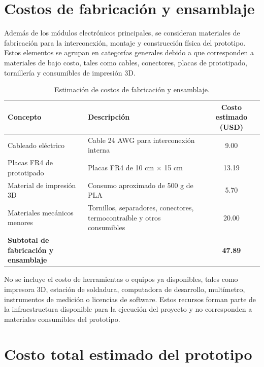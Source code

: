 \section{Costos de fabricación y ensamblaje}

Además de los módulos electrónicos principales, se consideran materiales de
fabricación para la interconexión, montaje y construcción física del prototipo.
Estos elementos se agrupan en categorías generales debido a que corresponden a
materiales de bajo costo, tales como cables, conectores, placas de prototipado,
tornillería y consumibles de impresión 3D.

\begin{table}[H]
\centering
\caption{Estimación de costos de fabricación y ensamblaje.}
\label{tab:presupuesto_fabricacion}
\begin{tabularx}{\textwidth}{X X c}
\toprule
\textbf{Concepto} &
\textbf{Descripción} &
\textbf{Costo estimado (USD)} \\
\midrule

Cableado eléctrico &
Cable 24 AWG para interconexión interna~ &
9.00 \\

Placas FR4 de prototipado &
Placas FR4 de 10 cm $\times$ 15 cm~ &
13.19 \\

Material de impresión 3D &
Consumo aproximado de 500 g de PLA~ &
5.70 \\

Materiales mecánicos menores &
Tornillos, separadores, conectores, termocontraíble y otros consumibles &
20.00 \\

\midrule
\textbf{Subtotal de fabricación y ensamblaje} &
&
\textbf{47.89} \\
\bottomrule
\end{tabularx}
\end{table}

No se incluye el costo de herramientas o equipos ya disponibles, tales como
impresora 3D, estación de soldadura, computadora de desarrollo, multímetro,
instrumentos de medición o licencias de software. Estos recursos forman parte
de la infraestructura disponible para la ejecución del proyecto y no
corresponden a materiales consumibles del prototipo.

\section{Costo total estimado del prototipo}

